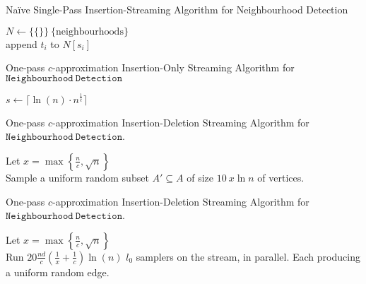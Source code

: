 \documentclass[11pt,twoside,a4paper]{article}
\begin{document}
\begin{algorithm}
\caption{Na\"ive Single-Pass Insertion-Streaming Algorithm for Neighbourhood Detection}
$N\leftarrow\{\{\}\}\ \{\text{neighbourhoods}\}$\\
 {
	append $t_i$ to $N[s_i]$\\
	 {
	}
}
\end{algorithm}

\begin{algorithm}
\caption{One-pass $c$-approximation Insertion-Only Streaming Algorithm for $\mathtt{Neighbourhood\ Detection}$}
$s\leftarrow\lceil\ln(n)\cdot n^{\frac1c}\rceil$\\
\end{algorithm}

\begin{algorithm}
\caption{One-pass $c$-approximation Insertion-Deletion Streaming Algorithm for $\mathtt{Neighbourhood\ Detection}$. }
Let $x=\max\left\{\frac{n}{c},\sqrt{n}\right\}$\\
Sample a uniform random subset $A'\subseteq A$ of size $10\ x\ln n$ of vertices.\\
\end{algorithm}

\begin{algorithm}
\caption{One-pass $c$-approximation Insertion-Deletion Streaming Algorithm for $\mathtt{Neighbourhood\ Detection}$. }
Let $x=\max\left\{\frac{n}{c},\sqrt{n}\right\}$\\
Run $20\frac{nd}{c}\left(\frac1x+\frac1c\right)\ln(n)$ $l_0$ samplers on the stream, in parallel. Each producing a uniform random edge.\\
\end{algorithm}
\end{document}
